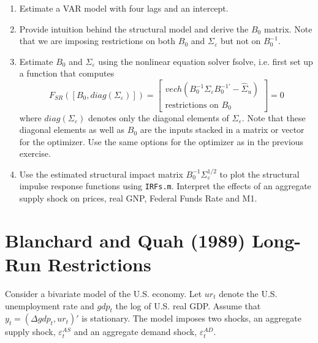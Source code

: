 \documentclass[a4paper]{scrartcl}
\begin{document}
    \begin{enumerate}
        \item Estimate a VAR model with four lags and an intercept.
        \item Provide intuition behind the structural model and derive the $B_0$ matrix. Note that we are imposing restrictions on both $B_0$ and $\Sigma_\varepsilon$ but not on $B_0^{-1}$.
        \item Estimate $B_0$ and $\Sigma_\varepsilon$ using the nonlinear equation solver fsolve, i.e. first set up a function that computes
              $$ F_{SR}([B_0, diag(\Sigma_\varepsilon)]) = \begin{bmatrix} vech\left(B_0^{-1} \Sigma_\varepsilon B_0^{-1'} - \hat{\Sigma}_u\right)\\\text{restrictions on }B_0\end{bmatrix}=0$$
              where $diag(\Sigma_\varepsilon)$ denotes only the diagonal elements of $\Sigma_\varepsilon$. Note that these diagonal elements as well as $B_0$ are the inputs stacked in a matrix or vector for the optimizer.
              Use the same options for the optimizer as in the previous exercise.
        \item Use the estimated structural impact matrix $B_0^{-1}\Sigma_\varepsilon^{1/2}$ to plot the structural impulse response functions using \texttt{IRFs.m}. Interpret the effects of an aggregate supply shock on prices, real GNP, Federal Funds Rate and M1.
    \end{enumerate}
    \newpage
    
    \section{Blanchard and Quah (1989) Long-Run Restrictions}
    Consider a bivariate model of the U.S. economy. Let $ur_t$ denote the U.S. unemployment rate
    and $gdp_t$ the log of U.S. real GDP. Assume that $y_t = (\Delta gdp_t, ur_t)'$ is stationary. The model imposes two shocks, an aggregate supply shock, $\varepsilon_t^{AS}$ and an aggregate demand shock, $\varepsilon_t^{AD}$.
    
\end{document}

